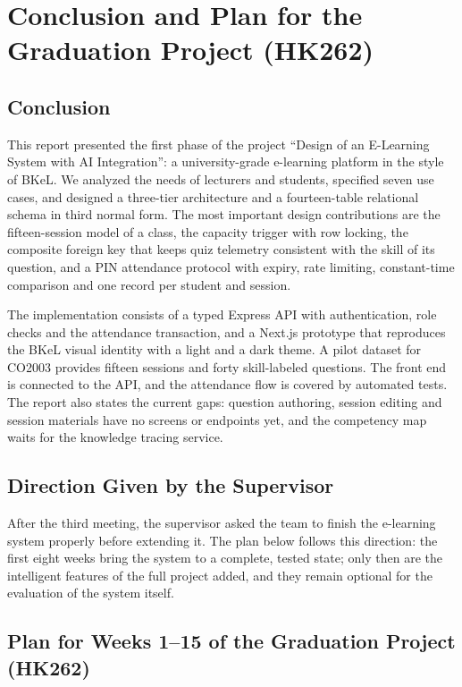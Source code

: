 \section{Conclusion and Plan for the Graduation Project (HK262)}
\label{ch:plan}

\subsection{Conclusion}

This report presented the first phase of the project ``Design of an E-Learning System with AI Integration'': a university-grade e-learning platform in the style of BKeL. We analyzed the needs of lecturers and students, specified seven use cases, and designed a three-tier architecture and a fourteen-table relational schema in third normal form. The most important design contributions are the fifteen-session model of a class, the capacity trigger with row locking, the composite foreign key that keeps quiz telemetry consistent with the skill of its question, and a PIN attendance protocol with expiry, rate limiting, constant-time comparison and one record per student and session.

The implementation consists of a typed Express API with authentication, role checks and the attendance transaction, and a Next.js prototype that reproduces the BKeL visual identity with a light and a dark theme. A pilot dataset for CO2003 provides fifteen sessions and forty skill-labeled questions. The front end is connected to the API, and the attendance flow is covered by automated tests. The report also states the current gaps: question authoring, session editing and session materials have no screens or endpoints yet, and the competency map waits for the knowledge tracing service.

\subsection{Direction Given by the Supervisor}

After the third meeting, the supervisor asked the team to finish the e-learning system properly before extending it. The plan below follows this direction: the first eight weeks bring the system to a complete, tested state; only then are the intelligent features of the full project added, and they remain optional for the evaluation of the system itself.

\subsection{Plan for Weeks 1--15 of the Graduation Project (HK262)}

